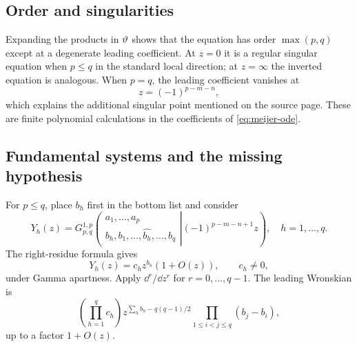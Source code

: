 \subsection{Order and singularities}

Expanding the products in $\vartheta$ shows that the equation has order
$\max(p,q)$ except at a degenerate leading coefficient.  At $z=0$ it is a
regular singular equation when $p\le q$ in the standard local direction; at
$z=\infty$ the inverted equation is analogous.  When $p=q$, the leading
coefficient vanishes at
\begin{equation}\label{eq:balanced-singularity}
 z=(-1)^{p-m-n},
\end{equation}
which explains the additional singular point mentioned on the source page.
These are finite polynomial calculations in the coefficients of
\eqref{eq:meijer-ode}.

\subsection{Fundamental systems and the missing hypothesis}

For $p\le q$, place $b_h$ first in the bottom list and consider
\begin{equation}\label{eq:right-basis}
 Y_h(z)=G_{p,q}^{1,p}\!\left(
 \left.\begin{matrix}a_1,\ldots,a_p\\
 b_h,b_1,\ldots,\widehat{b_h},\ldots,b_q
 \end{matrix}\right|(-1)^{p-m-n+1}z\right),
 \quad h=1,\ldots,q.
\end{equation}
The right-residue formula gives
\begin{equation}\label{eq:right-leading}
 Y_h(z)=c_hz^{b_h}(1+O(z)),\qquad c_h\ne0,
\end{equation}
under Gamma apartness.  Apply $\dd^{r}/\dd z^{r}$ for
$r=0,\ldots,q-1$.  The leading Wronskian is
\begin{equation}\label{eq:wronskian}
 \left(\prod_{h=1}^{q}c_h\right)
 z^{\sum_hb_h-q(q-1)/2}
 \prod_{1\le i<j\le q}(b_j-b_i),
\end{equation}
up to a factor $1+O(z)$.


